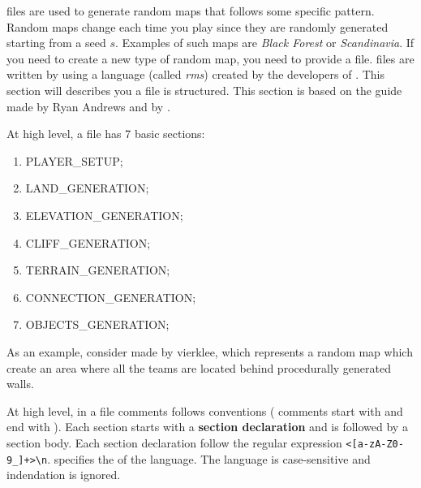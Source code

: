 \begin{appendices}
     files are used to generate random maps that follows some specific pattern. Random maps change each time you play since they are randomly generated starting from a seed $s$. Examples of such maps are \textit{Black Forest} or \textit{Scandinavia}. 
    If you need to create a new type of random map, you need to provide a  file.  files are written by using a language (called \textit{rms}) created by the developers of \aoe{}\cite{rms:2019}. This section will describes you a  file is structured. This section is based on the guide made by Ryan Andrews\cite{rms:2019} and by \cite{zetnus:2019}.

    At high level, a  file has 7 basic sections:
    
    \begin{enumerate}
        \item PLAYER\_SETUP;
        \item LAND\_GENERATION;
        \item ELEVATION\_GENERATION;
        \item CLIFF\_GENERATION;
        \item TERRAIN\_GENERATION;
        \item CONNECTION\_GENERATION;
        \item OBJECTS\_GENERATION;
    \end{enumerate}

    As an example, consider  made by vierklee, which represents a random map which create an area where all the teams are located behind procedurally generated walls.

    

    At high level, in a  file comments follows  conventions (\ie{} comments start with \dquote{/* } and end with \dquote{ */}). Each section starts with a \textbf{section declaration} and is followed by a section body. Each section declaration follow the regular expression \verb|<[a-zA-Z0-9_]+>\n|.  specifies the  of the  language. The language is case-sensitive and indendation is ignored\cite{zetnus:2019}.

    


\end{appendices}
